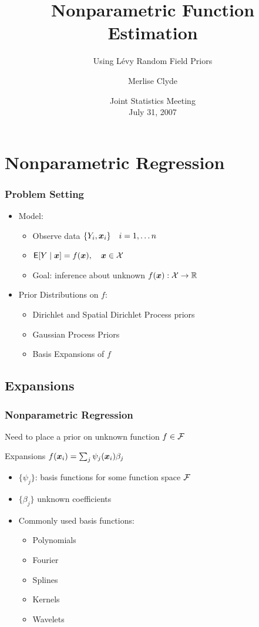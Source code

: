 \documentclass[dvips]{beamer}
\title{Nonparametric Function Estimation }
\subtitle{\Large Using L\'evy Random Field Priors}
\author[M. Clyde]{Merlise Clyde}
\institute{Department of Statistical Science \\ Duke
University }
\date{Joint Statistics  Meeting \\ July 31, 2007}
\newcommand{\bs}[2]{\begin{frame} \frametitle{#1} 
{#2}
\end{frame} }
\begin{document}
\begin{frame}
  \titlepage
\end{frame}


\section{Nonparametric Regression}
\bs{Problem Setting}{
  \begin{itemize}
  \item  Model:
    \begin{itemize}
    \item Observe data $\{Y_i, \bm x_i\} \quad i = 1, \dots n $
    \item $ {\sf{E}}[Y \mid \bm x] = f(\bm x), \quad \bm x \in \mathcal{X}$
    \item Goal: inference about unknown $f(\bm x):  \mathcal{X}\to\mathbb{R}$\\   
\end{itemize}

\item Prior Distributions on $f$:

\begin{itemize}
\item  Dirichlet and Spatial Dirichlet Process priors
\item  Gaussian Process Priors
\item  Basis Expansions of $f$
\end{itemize}
\end{itemize}
}

\subsection{Expansions}
\bs{Nonparametric Regression} {
Need to place a prior on unknown function $f \in \mathcal{F}$


Expansions $f(\bm x_i) = \sum_j  \psi_j(\bm x_i)\beta_j$
   \begin{itemize}
   \item  $\{\psi_j\}$: basis functions for some
     function space $\mathcal{F}$ %
   \item  $\{\beta_j\}$  unknown coefficients
   \item Commonly used basis functions:
 \begin{itemize}
 \item Polynomials
 \item Fourier 
 \item Splines 
 \item Kernels 
 \item Wavelets 
 \end{itemize} 
   \end{itemize}

}
\end{document}
